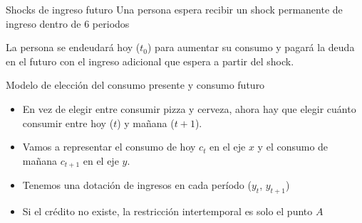 \documentclass{beamer}
\begin{document}
\begin{frame}{Shocks de ingreso futuro}
    \small Una persona espera recibir un shock permanente de ingreso dentro de 6 periodos 
    \begin{center}
    \begin{figure}[H]
    \begin{center}
    \end{center}
    \end{figure}
    \end{center}  
    \vspace{-1mm}
    \small La persona se endeudará hoy ($t_0$) para aumentar su consumo y pagará la deuda en el futuro con el ingreso adicional que espera a partir del shock.
\end{frame}

\begin{frame}{Modelo de elección del consumo presente y consumo futuro}
    \begin{itemize} \small
        \item En vez de elegir entre consumir pizza y cerveza, ahora hay que elegir cuánto consumir entre hoy ($t$) y mañana ($t+1$).
        \item Vamos a representar el consumo de hoy $c_t$ en el eje $x$ y el consumo de mañana $c_{t+1}$ en el eje $y$. 
        \item Tenemos una dotación de ingresos en cada período ($y_t$, $y_{t+1}$)
        \item Si el crédito no existe, la restricción intertemporal es solo el punto $A$
    \end{itemize}

    \begin{center}
    \begin{figure}[h!]
    \begin{center}
    \end{center}
    \end{figure}
    \end{center}  
\end{frame}
\end{document}
